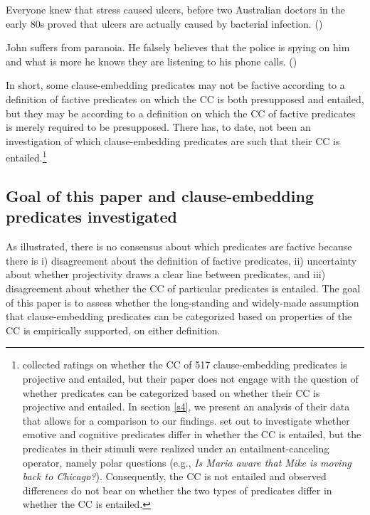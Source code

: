 \documentclass[11pt,fleqn]{article}
\newcommand{\6}{\mbox{$[\hspace*{-.6mm}[$}}
\newcommand{\9}{\mbox{$]\hspace*{-.6mm}]$}}
\begin{document}
\begin{exe}
\ex\label{know}
\begin{xlist}
\ex Everyone knew that stress caused ulcers, before two Australian doctors in the early 80s proved that ulcers are actually caused by bacterial infection. \hfill (\citealt[501]{hazlett2010})

\ex John suffers from paranoia. He falsely believes that the police is spying on him and what is more he knows they are listening to his phone calls. \hfill (\citealt[514]{abrusan2011})
\end{xlist}
\end{exe}

In short, some clause-embedding predicates may not be factive according to a definition of factive predicates on which the CC is both presupposed and entailed, but they may be according to a definition on which the CC of factive predicates is merely required to be presupposed. There has, to date, not been an investigation of which clause-embedding predicates are such that their CC is entailed.\footnote{\citet{white-rawlins-nels2018} collected ratings on whether the CC of 517 clause-embedding predicates is projective and entailed, but their paper does not engage with the question of whether predicates can be categorized based on whether their CC is projective and entailed. In section \ref{s4}, we present an analysis of their data that allows for a comparison to our findings. \citet{djaerv-etal2016} set out to investigate whether emotive and cognitive predicates differ in whether the CC is entailed, but the predicates in their stimuli were realized under an entailment-canceling operator, namely polar questions (e.g., {\em Is Maria aware that Mike is moving back to Chicago?}). Consequently, the CC is not entailed and observed differences do not bear on whether the two types of predicates differ in whether the CC is entailed.} 

\subsection{Goal of this paper and clause-embedding predicates investigated}

As illustrated, there is no consensus about which predicates are factive because there is i) disagreement about the definition of factive predicates, ii) uncertainty about whether projectivity draws a clear line between predicates, and iii) disagreement about whether the CC of particular predicates is entailed. The goal of this paper is to assess whether the long-standing and widely-made assumption that clause-embedding predicates can be categorized based on properties of the CC is empirically supported, on either definition.
\end{document}
